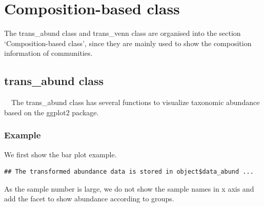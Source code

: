 \documentclass[
]{book}
\newenvironment{Shaded}{\begin{snugshade}}{\end{snugshade}}
\newcommand{\AttributeTok}[1]{\textcolor[rgb]{0.77,0.63,0.00}{#1}}
\newcommand{\CommentTok}[1]{\textcolor[rgb]{0.56,0.35,0.01}{\textit{#1}}}
\newcommand{\DecValTok}[1]{\textcolor[rgb]{0.00,0.00,0.81}{#1}}
\newcommand{\FunctionTok}[1]{\textcolor[rgb]{0.00,0.00,0.00}{#1}}
\newcommand{\NormalTok}[1]{#1}
\newcommand{\OtherTok}[1]{\textcolor[rgb]{0.56,0.35,0.01}{#1}}
\newcommand{\SpecialCharTok}[1]{\textcolor[rgb]{0.00,0.00,0.00}{#1}}
\newcommand{\StringTok}[1]{\textcolor[rgb]{0.31,0.60,0.02}{#1}}
\begin{document}
\hypertarget{composition-based-class}{%
\chapter{Composition-based class}\label{composition-based-class}}

The trans\_abund class and trans\_venn class are organised into the section `Composition-based class',
since they are mainly used to show the composition information of communities.

\hypertarget{trans_abund-class}{%
\section{trans\_abund class}\label{trans_abund-class}}

　The trans\_abund class has several functions to visualize taxonomic abundance based on the ggplot2 package.

\hypertarget{example}{%
\subsection{Example}\label{example}}

We first show the bar plot example.

\begin{Shaded}
\end{Shaded}

\begin{verbatim}
## The transformed abundance data is stored in object$data_abund ...
\end{verbatim}

\begin{Shaded}
\end{Shaded}

As the sample number is large, we do not show the sample names in x axis and add the facet to show abundance according to groups.
\end{document}
